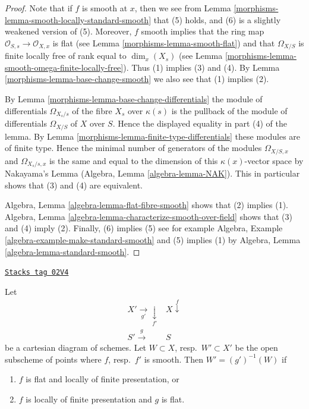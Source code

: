 \begin{proof}

Note that if $f$ is smooth at $x$, then we see from Lemma
\ref{morphisms-lemma-smooth-locally-standard-smooth} that (5) holds, and (6) is a slightly
weakened version of (5). Moreover, $f$ smooth implies that the ring
map $\mathcal{O}_{S, s} \to \mathcal{O}_{X, x}$ is flat (see
Lemma \ref{morphisms-lemma-smooth-flat}) and that $\Omega_{X/S}$ is
finite locally free of rank equal to
$\dim_x(X_s)$ (see Lemma \ref{morphisms-lemma-smooth-omega-finite-locally-free}).
Thus (1) implies (3) and (4). By Lemma \ref{morphisms-lemma-base-change-smooth}
we also see that (1) implies (2).

\medskip\noindent
By Lemma \ref{morphisms-lemma-base-change-differentials}
the module of differentials $\Omega_{X_s/s}$ of the fibre $X_s$
over $\kappa(s)$ is the pullback of the module of differentials
$\Omega_{X/S}$ of $X$ over $S$. Hence the displayed equality in
part (4) of the lemma. By Lemma \ref{morphisms-lemma-finite-type-differentials}
these modules are of finite type. Hence the minimal number of
generators of the modules
$\Omega_{X/S, x}$ and $\Omega_{X_s/s, x}$ is the same and equal to the
dimension of this $\kappa(x)$-vector space by Nakayama's Lemma
(Algebra, Lemma \ref{algebra-lemma-NAK}). This in particular shows that
(3) and (4) are equivalent.

\medskip\noindent
Algebra, Lemma \ref{algebra-lemma-flat-fibre-smooth} shows that
(2) implies (1).
Algebra, Lemma \ref{algebra-lemma-characterize-smooth-over-field}
shows that (3) and (4) imply (2). Finally, (6) implies (5)
see for example Algebra, Example \ref{algebra-example-make-standard-smooth}
and (5) implies (1) by Algebra, Lemma \ref{algebra-lemma-standard-smooth}.
\end{proof}

\begin{lemma}
\label{morphisms-lemma-set-points-where-fibres-smooth}
\href{https://stacks.math.columbia.edu/tag/02V4}{\texttt{Stacks tag 02V4}}

Let
$$
\begin{array}{cc}X' \underset{g'}{\longrightarrow}\underset{f'}{\downarrow} & X \overset{f}{\downarrow} \\ S' \overset{g}{\longrightarrow} & S\end{array}
$$
be a cartesian diagram of schemes. Let $W \subset X$, resp.\ $W' \subset X'$
be the open subscheme of points where $f$, resp.\ $f'$ is smooth.
Then $W' = (g')^{-1}(W)$ if
\begin{enumerate}
\item $f$ is flat and locally of finite presentation, or
\item $f$ is locally of finite presentation and $g$ is flat.
\end{enumerate}
\end{lemma}

